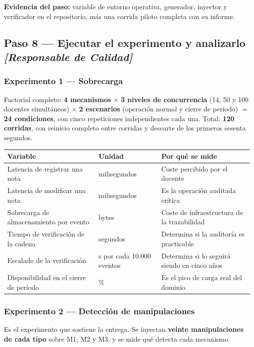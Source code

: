 \documentclass[11pt,a4paper]{article}
\newcommand{\paso}[1]{\subsection{#1}}
\begin{document}
	\textbf{Evidencia del paso:} variable de entorno operativa, generador, inyector y verificador en el repositorio, más una corrida piloto completa con su informe.
	
	\paso{Paso 8 --- Ejecutar el experimento y analizarlo \emph{[Responsable de Calidad]}}
	
	\subsubsection{Experimento 1 --- Sobrecarga}
	
	Factorial completo: \textbf{4 mecanismos} $\times$ \textbf{3 niveles de concurrencia} (14, 50 y 100 docentes simultáneos) $\times$ \textbf{2 escenarios} (operación normal y cierre de período) $=$ \textbf{24 condiciones}, con cinco repeticiones independientes cada una. Total: \textbf{120 corridas}, con reinicio completo entre corridas y descarte de los primeros sesenta segundos.
	
	\begin{center}
		\small
		\begin{tabular}{@{}p{5.2cm}p{3.2cm}p{6.2cm}@{}}
			\toprule
			\textbf{Variable} & \textbf{Unidad} & \textbf{Por qué se mide} \\
			\midrule
			Latencia de registrar una nota & milisegundos & Coste percibido por el docente \\
			Latencia de modificar una nota & milisegundos & Es la operación auditada crítica \\
			Sobrecarga de almacenamiento por evento & bytes & Coste de infraestructura de la trazabilidad \\
			Tiempo de verificación de la cadena & segundos & Determina si la auditoría es practicable \\
			Escalado de la verificación & s por cada 10.000 eventos & Determina si lo seguirá siendo en cinco años \\
			Disponibilidad en el cierre de período & \% & Es el pico de carga real del dominio \\
			\bottomrule
		\end{tabular}
	\end{center}
	
	\subsubsection{Experimento 2 --- Detección de manipulaciones}
	
	Es el experimento que sostiene la entrega. Se inyectan \textbf{veinte manipulaciones de cada tipo} sobre M1, M2 y M3, y se mide qué detecta cada mecanismo.
	
\end{document}
